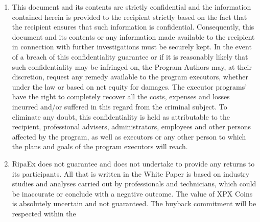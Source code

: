 \documentclass[11pt,fleqn]{book} %
\begin{document}
\begin{scriptsize}
{\begin{enumerate}
			These statements include, among other things, the
			discussions of each of RipaEx’s business strategies and
			expectations regarding its position in the economy, future
			operations, profitability, liquidity, assets and financial
			position. All of these statements are based on estimates
			and assumptions made by the program’s executors who,
			although considered reasonable, are subject to risks and
			uncertainties that may cause real events and that the
			results of the programs’ executors are materially different
			from those anticipated or indicated by such declarations
			and estimates and no guarantees may be given that any
			such statements or estimates will be made. In the light of
			these and other uncertainties, the inclusion of a forwardlooking
			statement in this document or the White Paper
			itself should not be considered as a representation or a
			guarantee by the TEC in any case.
			\item This document and its contents are strictly confidential
			and the information contained herein is provided to the recipient
			strictly based on the fact that the recipient ensures
			that such information is confidential.
			Consequently, this document and its contents or any
			information made available to the recipient in connection
			with further investigations must be securely kept. In the
			event of a breach of this confidentiality guarantee or if it is 
			reasonably likely that such confidentiality may be infringed
			on, the Program Authors may, at their discretion, request
			any remedy available to the program executors, whether
			under the law or based on net equity for damages. The
			executor programs’ have the right to completely recover all
			the costs, expenses and losses incurred and/or suffered
			in this regard from the criminal subject. To eliminate any
			doubt, this confidentiality is held as attributable to the
			recipient, professional advisers, administrators, employees
			and other persons affected by the program, as well as executors
			or any other person to which the plans and goals
			of the program executors will reach.
			\item RipaEx does not guarantee and does not undertake to
			provide any returns to its participants. All that is written in
			the White Paper is based on industry studies and analyses
			carried out by professionals and technicians, which could
			be inaccurate or conclude with a negative outcome.
			The value of XPX Coins is absolutely uncertain and not
			guaranteed.
			The buyback commitment will be respected within the

\end{enumerate}}
\end{scriptsize}
\end{document}
